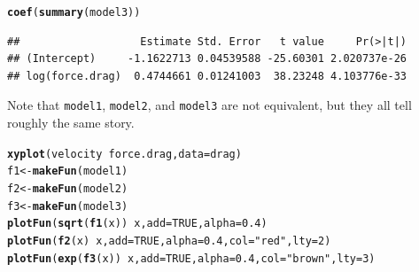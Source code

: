 \documentclass[twoside]{book}\usepackage[]{graphicx}\usepackage[]{xcolor}
\makeatletter
\newcommand{\hlnum}[1]{\textcolor[rgb]{0.686,0.059,0.569}{#1}}%
\newcommand{\hlstr}[1]{\textcolor[rgb]{0.192,0.494,0.8}{#1}}%
\newcommand{\hlopt}[1]{\textcolor[rgb]{0,0,0}{#1}}%
\newcommand{\hlstd}[1]{\textcolor[rgb]{0.345,0.345,0.345}{#1}}%
\newcommand{\hlkwb}[1]{\textcolor[rgb]{0.69,0.353,0.396}{#1}}%
\newcommand{\hlkwc}[1]{\textcolor[rgb]{0.333,0.667,0.333}{#1}}%
\newcommand{\hlkwd}[1]{\textcolor[rgb]{0.737,0.353,0.396}{\textbf{#1}}}%
\newenvironment{kframe}{%
 \def\at@end@of@kframe{}%
 \ifinner\ifhmode%
  \def\at@end@of@kframe{\end{minipage}}%
  \begin{minipage}{\columnwidth}%
 \fi\fi%
 \def\FrameCommand##1{\hskip\@totalleftmargin \hskip-\fboxsep
 \colorbox{shadecolor}{##1}\hskip-\fboxsep
     \hskip-\linewidth \hskip-\@totalleftmargin \hskip\columnwidth}%
 \MakeFramed {\advance\hsize-\width
   \@totalleftmargin\z@ \linewidth\hsize
   \@setminipage}}%
 {\par\unskip\endMakeFramed%
 \at@end@of@kframe}
\newenvironment{knitrout}{}{} %
\makeatother
\begin{document}
\begin{solution}
\begin{knitrout}
\begin{kframe}
\begin{alltt}
\hlkwd{coef}\hlstd{(}\hlkwd{summary}\hlstd{(model3))}
\end{alltt}
\begin{verbatim}
##                   Estimate Std. Error   t value     Pr(>|t|)
## (Intercept)     -1.1622713 0.04539588 -25.60301 2.020737e-26
## log(force.drag)  0.4744661 0.01241003  38.23248 4.103776e-33
\end{verbatim}
\end{kframe}
\end{knitrout}
Note that \verb!model1!, \verb!model2!, and \verb!model3! are not equivalent, 
but they all tell roughly the same story.
\begin{knitrout}
\color{fgcolor}\begin{kframe}
\begin{alltt}
\hlkwd{xyplot}\hlstd{(velocity} \hlopt{~} \hlstd{force.drag,} \hlkwc{data} \hlstd{= drag)}
\hlstd{f1} \hlkwb{<-} \hlkwd{makeFun}\hlstd{(model1)}
\hlstd{f2} \hlkwb{<-} \hlkwd{makeFun}\hlstd{(model2)}
\hlstd{f3} \hlkwb{<-} \hlkwd{makeFun}\hlstd{(model3)}
\hlkwd{plotFun}\hlstd{(}\hlkwd{sqrt}\hlstd{(}\hlkwd{f1}\hlstd{(x))} \hlopt{~} \hlstd{x,} \hlkwc{add} \hlstd{=} \hlnum{TRUE}\hlstd{,} \hlkwc{alpha} \hlstd{=} \hlnum{0.4}\hlstd{)}
\hlkwd{plotFun}\hlstd{(}\hlkwd{f2}\hlstd{(x)} \hlopt{~} \hlstd{x,} \hlkwc{add} \hlstd{=} \hlnum{TRUE}\hlstd{,} \hlkwc{alpha} \hlstd{=} \hlnum{0.4}\hlstd{,} \hlkwc{col} \hlstd{=} \hlstr{"red"}\hlstd{,} \hlkwc{lty} \hlstd{=} \hlnum{2}\hlstd{)}
\hlkwd{plotFun}\hlstd{(}\hlkwd{exp}\hlstd{(}\hlkwd{f3}\hlstd{(x))} \hlopt{~} \hlstd{x,} \hlkwc{add} \hlstd{=} \hlnum{TRUE}\hlstd{,} \hlkwc{alpha} \hlstd{=} \hlnum{0.4}\hlstd{,} \hlkwc{col} \hlstd{=} \hlstr{"brown"}\hlstd{,} \hlkwc{lty} \hlstd{=} \hlnum{3}\hlstd{)}
\end{alltt}
\end{kframe}


\end{knitrout}
\end{solution}
\end{document}
